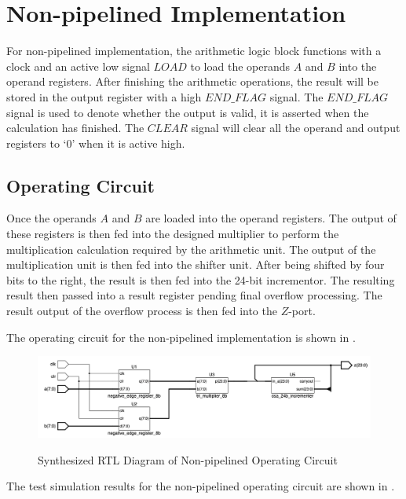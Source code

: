 \section{Non-pipelined Implementation}

For non-pipelined implementation, the arithmetic logic block functions with a clock
and an active low signal \(LOAD\) to load the operands \(A\) and \(B\) into the operand registers.
After finishing the arithmetic operations, the result will be stored in the output register with a high \(END\_FLAG\) signal.
The \(END\_FLAG\) signal is used to denote whether the output is valid, it is asserted when the calculation has finished.
The \(CLEAR\) signal will clear all the operand and output registers to ‘0’ when it is active high.

\subsection{Operating Circuit}

Once the operands \(A\) and \(B\) are loaded into the operand registers.
The output of these registers is then fed into the designed multiplier to perform the multiplication calculation required by the arithmetic unit.
The output of the multiplication unit is then fed into the shifter unit.
After being shifted by four bits to the right, the result is then fed into the 24-bit incrementor.
The resulting result then passed into a result register pending final overflow processing.
The result output of the overflow process is then fed into the \(Z\)-port.

\noindent The operating circuit for the non-pipelined implementation is shown in .

\begin{figure}[!htp]
	\centering
	\caption{Synthesized RTL Diagram of Non-pipelined Operating Circuit}
	\includegraphics[width=\textwidth]{../img/non_p_op_rtl.png}
	\label{fig:non_p_op_rtl}
\end{figure}

The test simulation results for the non-pipelined operating circuit are shown in .

